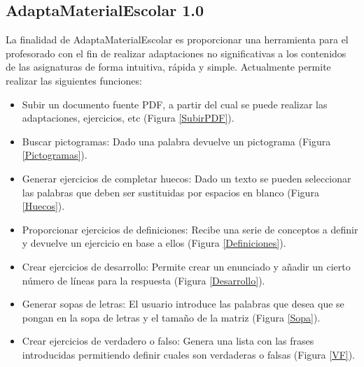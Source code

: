 \subsection{AdaptaMaterialEscolar 1.0}
\label{cap:adaptaMaterial}
La finalidad de AdaptaMaterialEscolar es proporcionar una herramienta para el profesorado con el fin de realizar adaptaciones no significativas a los contenidos de las asignaturas de forma intuitiva, rápida y simple. Actualmente permite realizar las siguientes funciones:
\begin{itemize}
    \item Subir un documento fuente PDF, a partir del cual se puede realizar las adaptaciones, ejercicios, etc (Figura \ref{SubirPDF}).
    \item Buscar pictogramas: Dado una palabra devuelve un pictograma (Figura \ref{Pictogramas}).
    \item Generar ejercicios de completar huecos: Dado un texto se pueden seleccionar las palabras que deben ser sustituidas por espacios en blanco (Figura \ref{Huecos}).
    \item Proporcionar ejercicios de definiciones: Recibe una serie de conceptos a definir y devuelve un ejercicio en base a ellos (Figura \ref{Definiciones}).
    \item Crear ejercicios de desarrollo: Permite crear un enunciado y añadir un cierto número de líneas para la respuesta (Figura \ref{Desarrollo}).
    \item Generar sopas de letras: El usuario introduce las palabras que desea que se pongan en la sopa de letras y el tamaño de la matriz (Figura \ref{Sopa}).
    \item Crear ejercicios de verdadero o falso: Genera una lista con las frases introducidas permitiendo definir cuales son verdaderas o falsas (Figura \ref{VF}).
\end{itemize}

